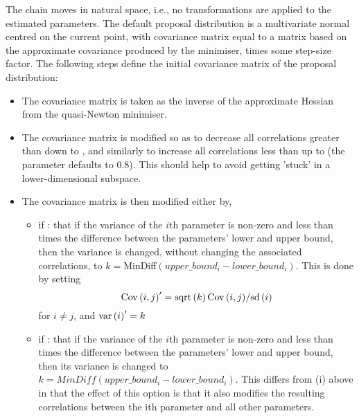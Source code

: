The chain moves in natural space, i.e., no transformations are applied to the estimated parameters. The default proposal distribution is a multivariate normal centred on the current point, with covariance matrix equal to a matrix based on the approximate covariance produced by the minimiser, times some step-size factor. The following steps define the initial covariance matrix of the proposal distribution: 

\begin{itemize}
\item The covariance matrix is taken as the inverse of the approximate Hessian from the quasi-Newton minimiser.

\item The covariance matrix is modified so as to decrease all correlations greater than  down to , and similarly to increase all correlations less than   up to  (the  parameter defaults to 0.8). This should help to avoid getting 'stuck' in a lower-dimensional subspace.

\item The covariance matrix is then modified either by,

\begin{itemize}
\item if : that if the variance of the $i$th parameter is non-zero and less than  times the difference between the parameters' lower and upper bound, then the variance is changed, without changing the associated correlations, to $k=$MinDiff$(upper\_bound_i-lower\_bound_i)$. This is done by setting \[
{\mathop{\rm Cov}\nolimits} \left( {i,j} \right)^\prime   = {{{\mathop{\rm sqrt}\nolimits} \left( k \right){\mathop{\rm Cov}\nolimits} \left( {i,j} \right)} \mathord{\left/
{\vphantom {{{\mathop{\rm sqrt}\nolimits} \left( k \right){\mathop{\rm Cov}\nolimits} \left( {i,j} \right)} {{\mathop{\rm sd}\nolimits} \left( i \right)}}} \right.
\kern-\nulldelimiterspace} {{\mathop{\rm sd}\nolimits} \left( i \right)}}
\]
for $i \ne j$, and ${\mathop{\rm var}} \left( i \right)^\prime   = k$

\item if : that if the variance of the $i$th parameter is non-zero and less than  times the difference between the parameters' lower and upper bound, then its variance is changed to $k=MinDiff(upper\_bound_i-lower\_bound_i)$. This differs from (i) above in that the effect of this option is that it also modifies the resulting correlations between the ith parameter and all other parameters.
\end{itemize}


\end{itemize}
